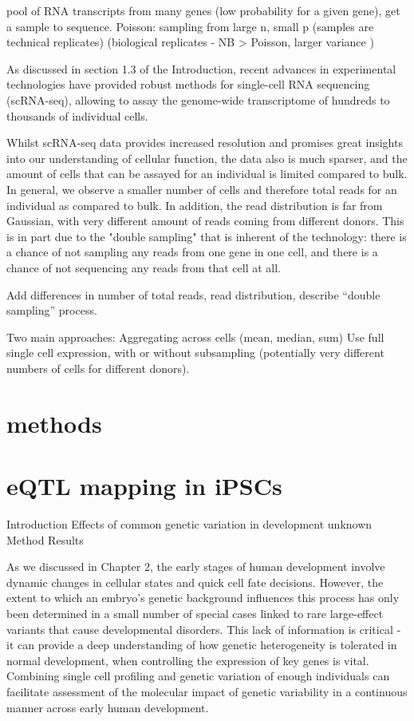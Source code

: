 pool of RNA transcripts from many genes (low probability for a given gene), get a sample to sequence. Poisson: sampling from large n, small p (samples are technical replicates)
(biological replicates - NB > Poisson, larger variance )

As discussed in section 1.3 of the Introduction, recent advances in experimental technologies have provided robust methods for single-cell RNA sequencing (scRNA-seq), allowing to assay the genome-wide transcriptome of hundreds to thousands of individual cells. 

Whilst scRNA-seq data provides increased resolution and promises great insights into our understanding of cellular function, the data also is much sparser, and the amount of cells that can be assayed for an individual is limited compared to bulk.
In general, we observe a smaller number of cells and therefore total reads for an individual as compared to bulk. In addition, the read distribution is far from Gaussian, with very different amount of reads coming from different donors. This is in part due to the "double sampling" that is inherent of the technology: there is a chance of not sampling any reads from one gene in one cell, and there is a chance of not sequencing any reads from that cell at all.

Add differences in number of total reads, read distribution, describe “double sampling” process.

Two main approaches:
Aggregating across cells (mean, median, sum)
Use full single cell expression, with or without subsampling (potentially very different numbers of cells for different donors).


\section{methods}

\section{eQTL mapping in iPSCs}

Introduction
Effects of common genetic variation in development unknown
Method
Results

As we discussed in Chapter 2, the early stages of human development involve dynamic changes in cellular states and quick cell fate decisions. However, the extent to which an embryo’s genetic background influences this process has only been determined in a small number of special cases linked to rare large-effect variants that cause developmental disorders. This lack of information is critical - it can provide a deep understanding of how genetic heterogeneity is tolerated in normal development, when controlling the expression of key genes is vital. Combining single cell profiling and genetic variation of enough individuals can facilitate assessment of the molecular impact of genetic variability in a continuous manner across early human development.
 
